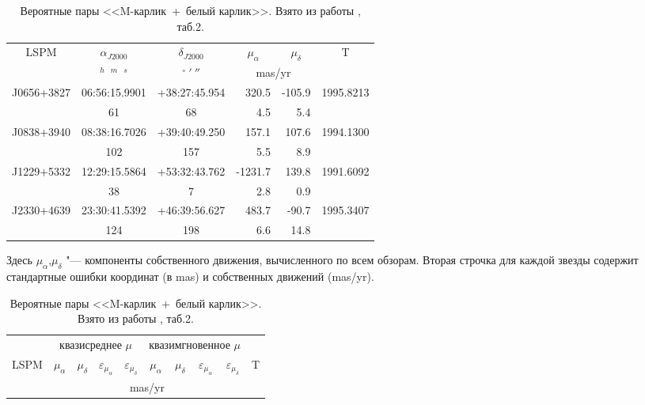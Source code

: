 \begin{table}[t]
\vspace{6mm}
\centering
\caption{Вероятные пары <<M-карлик~+~белый карлик>>. Взято из работы \cite{2015AstL...41..833K}, таб.2.}
\label{tab:MDWD}
\vspace{5mm}

\begin{tabularx}{\textwidth}{c|c|c|r|r|c} 
\hline
\multirow{2}{*}{LSPM} & $\alpha_{J2000}$ & $\delta_{J2000}$ &\multicolumn{1}{c|}{$\mu_\alpha$}&\multicolumn{1}{c|}{$\mu_\delta$}& \multirow{2}{*}{T} \\ \cline{2-5}
& $^h$~$^m$~$^s$  & $^\circ~'~''$ & \multicolumn{2}{c|}{mas/yr} & \\ \hline
J0656+3827 & 06:56:15.9901 & +38:27:45.954 &   320.5 & -105.9 & 1995.8213 \\
           & 61            & 68            &     4.5 &    5.4 & \\
J0838+3940 & 08:38:16.7026 & +39:40:49.250 &   157.1 &  107.6 & 1994.1300 \\
           & 102           & 157           &     5.5 &    8.9 & \\
J1229+5332 & 12:29:15.5864 & +53:32:43.762 & -1231.7 &  139.8 & 1991.6092 \\
           & 38            & 7             &     2.8 &    0.9 & \\
J2330+4639 & 23:30:41.5392 & +46:39:56.627 &   483.7 &  -90.7 & 1995.3407 \\
           & 124           & 198           &     6.6 &   14.8 & \\ \hline
\end{tabularx}
\begin{flushleft}
\footnotesize     
Здесь $\mu_\alpha$,$\mu_\delta$ "--- компоненты собственного движения, вычисленного по всем обзорам. Вторая строчка для каждой звезды содержит стандартные ошибки координат (в mas) и собственных движений (mas/yr).
\end{flushleft}
\begin{tabularx}{\textwidth}{l|r|r|r|r|r|r|r|r|c} \hline
     & \multicolumn{4}{c|}{квазисреднее $\mu$ }
     &\multicolumn{4}{c|}{квазимгновенное $\mu$}&  \\ \cline{2-9}
\multicolumn{1}{c|}{LSPM}&\multicolumn{1}{c|}{$\mu_\alpha$}&\multicolumn{1}{c|}{$\mu_\delta$}&\multicolumn{1}{c|}{$\varepsilon_{\mu_\alpha}$}&\multicolumn{1}{c|}{$\varepsilon_{\mu_\delta}$}
	 &\multicolumn{1}{c|}{$\mu_\alpha$}&\multicolumn{1}{c|}{$\mu_\delta$}&\multicolumn{1}{c|}{$\varepsilon_{\mu_\alpha}$}&\multicolumn{1}{c|}{$\varepsilon_{\mu_\delta}$}
	 &   T\\ \cline{2-9} 
     &\multicolumn{8}{c|}{mas/yr}&\\ \hline


\end{tabularx}
\end{table}
